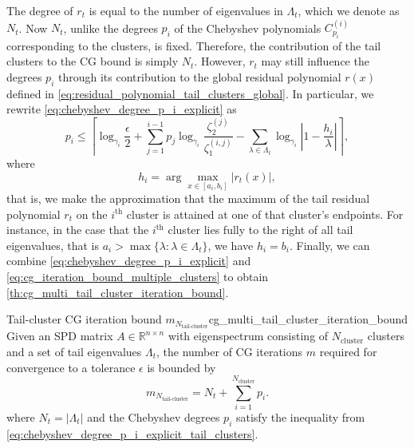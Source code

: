 The degree of $r_{t}$ is equal to the number of eigenvalues in $\Lambda_{t}$, which we denote as $N_{t}$. Now $N_{t}$, unlike the degrees $p_i$ of the Chebyshev polynomials $C^{(i)}_{p_i}$ corresponding to the clusters, is fixed. Therefore, the contribution of the tail clusters to the CG bound is simply $N_{t}$. However, $r_{t}$ may still influence the degrees $p_i$ through its contribution to the global residual polynomial $r(x)$ defined in \cref{eq:residual_polynomial_tail_clusters_global}. In particular, we rewrite \cref{eq:chebyshev_degree_p_i_explicit} as
\begin{equation}
    p_i \leq \left\lceil\log_{\gamma_i}{\frac{\epsilon}{2}} + \sum_{j=1}^{i-1} p_j\log_{\gamma_i}{\frac{\zeta^{(j)}_2}{\zeta^{(i,j)}_1}} - \sum_{\lambda\in\Lambda_{t}}
    \log_{\gamma_i}\left|1-\frac{h_i}{\lambda}\right|\right\rceil,
    \label{eq:chebyshev_degree_p_i_explicit_tail_clusters}
\end{equation}
where
\[
    h_i = \arg\max_{x\in[a_i,b_i]} \left|r_{t}(x)\right|,
\]
that is, we make the approximation that the maximum of the tail residual polynomial $r_{t}$ on the $i^{\text{th}}$ cluster is attained at one of that cluster's endpoints. For instance, in the case that the $i^{\text{th}}$ cluster lies fully to the right of all tail eigenvalues, that is $a_i > \max\{\lambda : \lambda \in \Lambda_{t}\}$, we have $h_i = b_i$. Finally, we can combine \cref{eq:chebyshev_degree_p_i_explicit}
and \cref{eq:cg_iteration_bound_multiple_clusters} to obtain \cref{th:cg_multi_tail_cluster_iteration_bound}.
\begin{fancyth}{Tail-cluster CG iteration bound $m_{N_{\text{tail-cluster}}}$}{cg_multi_tail_cluster_iteration_bound}
    Given an SPD matrix $A \in \mathbb{R}^{n \times n}$ with eigenspectrum consisting of $N_{\text{cluster}}$ clusters and a set of tail eigenvalues $\Lambda_{t}$, the number of CG iterations $m$ required for convergence to a tolerance $\epsilon$ is bounded by
    \begin{equation}
        m_{N_{\text{tail-cluster}}} = N_{t} + \sum_{i=1}^{N_{\text{cluster}}} p_i.
        \label{eq:cg_iteration_bound_multiple_clusters_s}
    \end{equation}
    where $N_{t} = |\Lambda_{t}|$ and the Chebyshev degrees $p_i$ satisfy the inequality from \cref{eq:chebyshev_degree_p_i_explicit_tail_clusters}.
\end{fancyth}


